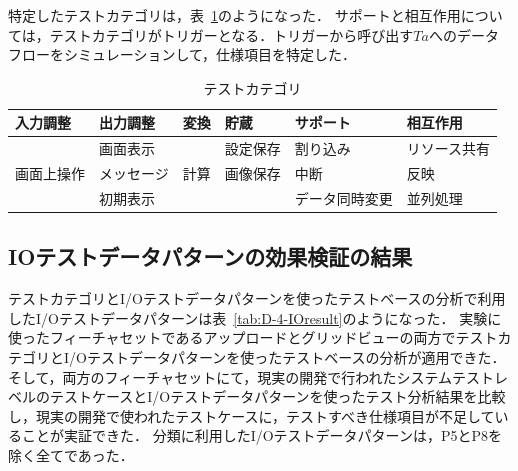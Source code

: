 特定したテストカテゴリは，表~\ref{tab:D-4-TestCategory}のようになった．
サポートと相互作用については，テストカテゴリがトリガーとなる．トリガーから呼び出す$Ta$へのデータフローをシミュレーションして，仕様項目を特定した．


\begin{table}[htbp]
  \centering
  \caption{テストカテゴリ}
    \begin{tabular}{|l|p{5.415em}|l|l|l|l|}
    \hline
          \multicolumn{1}{|p{4em}|}{\textbf{入力調整}} & \textbf{出力調整} & \multicolumn{1}{p{2.5em}|}{\textbf{変換}} & \multicolumn{1}{p{3em}|}{\textbf{貯蔵}} & \multicolumn{1}{p{6em}|}{\textbf{サポート}} & \multicolumn{1}{p{6em}|}{\textbf{相互作用}} \bigstrut\\
    \hline
    \hline
\multicolumn{1}{|l|}{\multirow{3}[2]{*}{画面上操作}} & 画面表示  & \multicolumn{1}{l|}{\multirow{3}[2]{*}{計算}} & \multicolumn{1}{p{4em}|}{設定保存} & 割り込み  & リソース共有 \bigstrut[t]\\
                & メッセージ &       & \multicolumn{1}{p{4em}|}{画像保存} & 中断    & 反映 \\
                & 初期表示  &       &       & データ同時変更 & 並列処理 \bigstrut[b]\\
    \hline
    \end{tabular}%
  \label{tab:D-4-TestCategory}%
\end{table}%

\subsection{IOテストデータパターンの効果検証の結果}
テストカテゴリとI/Oテストデータパターンを使ったテストベースの分析で利用したI/Oテストデータパターンは表~\ref{tab:D-4-IOresult}のようになった．
実験に使ったフィーチャセットであるアップロードとグリッドビューの両方でテストカテゴリとI/Oテストデータパターンを使ったテストベースの分析が適用できた．
そして，両方のフィーチャセットにて，現実の開発で行われたシステムテストレベルのテストケースとI/Oテストデータパターンを使ったテスト分析結果を比較し，現実の開発で使われたテストケースに，テストすべき仕様項目が不足していることが実証できた．
分類に利用したI/Oテストデータパターンは，P5とP8を除く全てであった．

